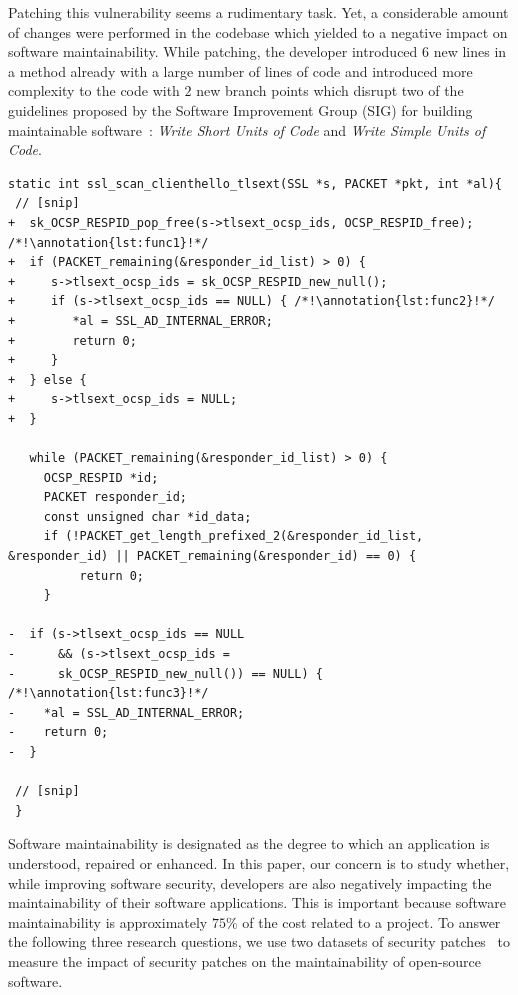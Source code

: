\documentclass[smallextended]{svjour3}       %
\newcounter{lstannotation}
\renewcommand{\thelstannotation}{\ding{\number\numexpr181+\arabic{lstannotation}}}
\newcommand{\annotation}[1]{\refstepcounter{lstannotation}\label{#1}\thelstannotation}
\begin{document}
Patching this vulnerability seems a rudimentary task. Yet,
a considerable amount of changes were performed in the codebase 
which yielded to a negative impact on software maintainability.
While patching, the developer introduced $6$ new lines in a method 
already with a large number of lines of code and introduced more 
complexity to the code with $2$ new branch points which disrupt two of 
the guidelines proposed by the Software Improvement Group 
(SIG) for building maintainable software~\cite{Visser:2016:OREILLY}: 
\emph{Write Short Units of Code} and \emph{Write Simple Units of 
Code}. 

\medskip
\setcounter{lstannotation}{0}
\begin{lstlisting}[style={CStyle}, caption={Patch provided by OpenSSL developers to the
CVE-2016-6304 vulnerability on file ssl/t1\_lib.c},label={lst:vuln}]
static int ssl_scan_clienthello_tlsext(SSL *s, PACKET *pkt, int *al){ 
 // [snip]
+  sk_OCSP_RESPID_pop_free(s->tlsext_ocsp_ids, OCSP_RESPID_free); /*!\annotation{lst:func1}!*/
+  if (PACKET_remaining(&responder_id_list) > 0) { 
+     s->tlsext_ocsp_ids = sk_OCSP_RESPID_new_null();
+     if (s->tlsext_ocsp_ids == NULL) { /*!\annotation{lst:func2}!*/
+        *al = SSL_AD_INTERNAL_ERROR;
+        return 0;
+     }
+  } else {
+     s->tlsext_ocsp_ids = NULL;
+  }

   while (PACKET_remaining(&responder_id_list) > 0) {
     OCSP_RESPID *id;
     PACKET responder_id;
     const unsigned char *id_data;
     if (!PACKET_get_length_prefixed_2(&responder_id_list, &responder_id) || PACKET_remaining(&responder_id) == 0) {
          return 0;
     }

-  if (s->tlsext_ocsp_ids == NULL 
-      && (s->tlsext_ocsp_ids = 
-      sk_OCSP_RESPID_new_null()) == NULL) { /*!\annotation{lst:func3}!*/
-    *al = SSL_AD_INTERNAL_ERROR;
-    return 0;
-  }

 // [snip]
 }
\end{lstlisting}

Software maintainability is designated as the degree to which an 
application is understood, repaired or enhanced. In this paper, our 
concern is to study whether, while improving software security, 
developers are also negatively impacting the maintainability of their
software applications. This is important because software 
maintainability is approximately $75\%$ of the cost related to a 
project. To answer the following three research questions, we use 
two datasets of security 
patches~\cite{Reis:2017:IJSSE,10.1109/MSR.2019.00064} to measure the 
impact of security patches on the maintainability of open-source 
software. 
%
\end{document}
